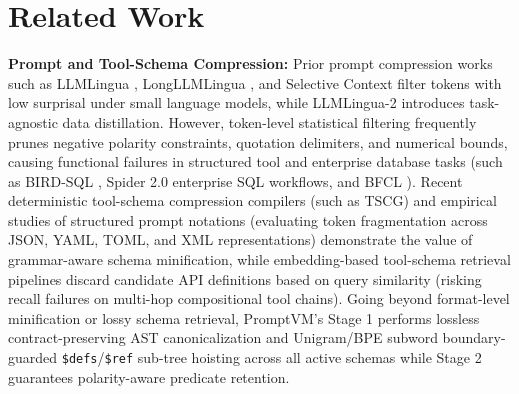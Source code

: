 \documentclass[conference,10pt]{IEEEtran}
\begin{document}
\section{Related Work}
\label{sec:related}
\textbf{Prompt and Tool-Schema Compression:} Prior prompt compression works such as LLMLingua \cite{jiang2023llmlingua}, LongLLMLingua \cite{jiang2024longllmlingua}, and Selective Context \cite{li2023selective} filter tokens with low surprisal under small language models, while LLMLingua-2 \cite{pan2024llmlingua2} introduces task-agnostic data distillation. However, token-level statistical filtering frequently prunes negative polarity constraints, quotation delimiters, and numerical bounds, causing functional failures in structured tool and enterprise database tasks (such as BIRD-SQL \cite{bird2023}, Spider 2.0 enterprise SQL workflows, and BFCL \cite{patil2024gorilla}). Recent deterministic tool-schema compression compilers (such as TSCG) and empirical studies of structured prompt notations (evaluating token fragmentation across JSON, YAML, TOML, and XML representations) demonstrate the value of grammar-aware schema minification, while embedding-based tool-schema retrieval pipelines discard candidate API definitions based on query similarity (risking recall failures on multi-hop compositional tool chains). Going beyond format-level minification or lossy schema retrieval, PromptVM's Stage 1 performs lossless contract-preserving AST canonicalization and Unigram/BPE subword boundary-guarded \texttt{\$defs}/\texttt{\$ref} sub-tree hoisting across all active schemas while Stage 2 guarantees polarity-aware predicate retention.
\end{document}
